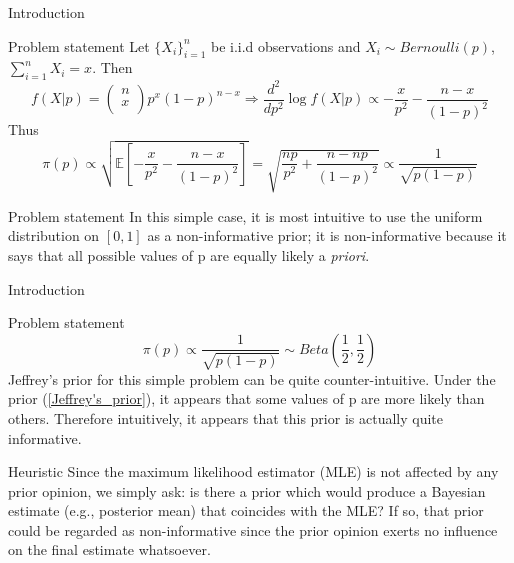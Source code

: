 \documentclass{beamer}
\begin{document}
\begin{frame}{Introduction}
    \begin{block}{Problem statement}
        Let $\{X_i\}_{i=1}^n$ be i.i.d observations and $X_i \sim Bernoulli(p)$, $\sum_{i=1}^n X_i = x$. Then
        \begin{equation}\label{MLE}
            f(X|p) = \begin{pmatrix}
        n \\
        x \\
        \end{pmatrix}
        p^x(1-p)^{n-x} \Rightarrow \dfrac{d^2}{dp^2}\log f(X|p) \propto -\dfrac{x}{p^2} - \dfrac{n - x}{(1 - p)^2}
        \end{equation}
        Thus
        \[\pi(p) \propto \sqrt{\mathbb{E}\left[-\dfrac{x}{p^2} - \dfrac{n - x}{(1 - p)^2}\right]} = \sqrt{\dfrac{np}{p^2} + \dfrac{n - np}{(1 - p)^2}} \propto \dfrac{1}{\sqrt{p(1-p)}}\]
    \end{block}
    
    \begin{block}{Problem statement}
        In this simple case, it is most intuitive to use the uniform distribution on $[0,1]$ as a non-informative prior; it is non-informative because it says that all possible values of p are equally likely a \textit{priori}.
    \end{block}

\end{frame}


\begin{frame}{Introduction}
    \begin{block}{Problem statement}
        \begin{equation}\label{Jeffrey's_prior}
            \pi(p) \propto \dfrac{1}{\sqrt{p(1-p)}} \sim Beta\left(\frac{1}{2}, \frac{1}{2}\right)
        \end{equation}
        Jeffrey’s prior for this simple problem can be quite counter-intuitive. Under the prior (\ref{Jeffrey's_prior}), it appears that some values of p are more likely than others. Therefore intuitively, it appears that this prior is actually quite informative.
    \end{block}
    
    \begin{block}{Heuristic}
       Since the maximum likelihood estimator (MLE) is not affected by any prior opinion, we simply ask: is there a prior which would produce a Bayesian estimate (e.g., posterior mean) that coincides with the MLE? If so, that prior could be regarded as non-informative since the prior opinion exerts no influence on the final estimate whatsoever.
   \end{block}
\end{frame}
\end{document}
